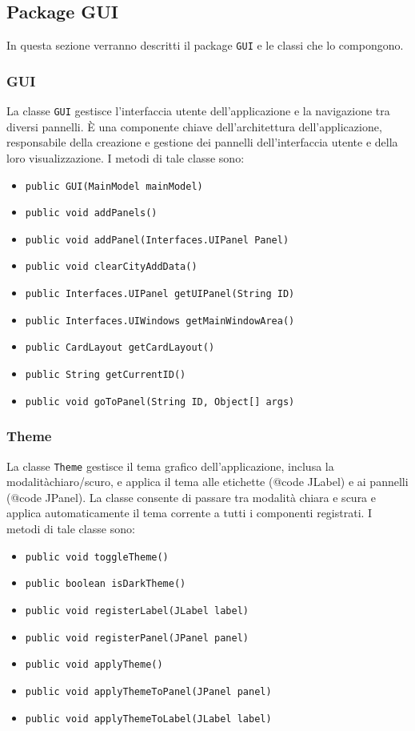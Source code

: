 \subsection{Package GUI}
In questa sezione verranno descritti il package \texttt{GUI} e le classi che lo compongono.\\

\subsubsection {GUI}
La classe \texttt{GUI} gestisce l'interfaccia utente dell'applicazione e la navigazione tra diversi pannelli. 
È una componente chiave dell'architettura dell'applicazione, responsabile della creazione e gestione dei pannelli dell'interfaccia utente e della loro visualizzazione.
I metodi di tale classe sono:
\begin{itemize}
    \item \texttt{public GUI(MainModel mainModel)}
    \item \texttt{public void addPanels()}
    \item \texttt{public void addPanel(Interfaces.UIPanel Panel)}
    \item \texttt{public void clearCityAddData()}
    \item \texttt{public Interfaces.UIPanel getUIPanel(String ID)}
    \item \texttt{public Interfaces.UIWindows getMainWindowArea()}
    \item \texttt{public CardLayout getCardLayout()}
    \item \texttt{public String getCurrentID()}
    \item \texttt{public void goToPanel(String ID, Object[] args)}
\end{itemize}

\subsubsection {Theme}
La classe \texttt{Theme} gestisce il tema grafico dell'applicazione, inclusa la modalitàchiaro/scuro, e applica il tema alle etichette ({@code JLabel}) e ai pannelli ({@code JPanel}).
La classe consente di passare tra modalità chiara e scura e applica automaticamente il tema corrente a tutti i componenti registrati.
I metodi di tale classe sono:
\begin{itemize}
    \item \texttt{public void toggleTheme()}
    \item \texttt{public boolean isDarkTheme()}
    \item \texttt{public void registerLabel(JLabel label)}
    \item \texttt{public void registerPanel(JPanel panel)}
    \item \texttt{public void applyTheme()}
    \item \texttt{public void applyThemeToPanel(JPanel panel)}
    \item \texttt{public void applyThemeToLabel(JLabel label)}
\end{itemize}

